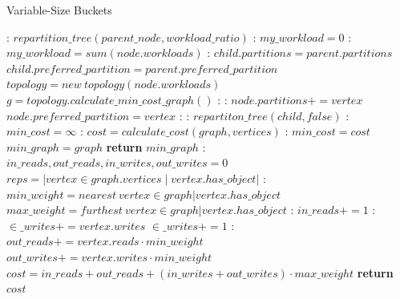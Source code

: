 \begin{algorithm}
  \caption{Variable-Size Buckets}\label{alg:variable-size}
  \begin{algorithmic}[1]
    :
  \State $repartition\_tree(parent\_node, workload\_ratio)$
  \EndFunction
  :
    \State $my\_workload = 0$
    :
      \State $my\_workload = sum(node.workloads)$
      :
      \State $child.partitions = parent.partitions$
      \State $child.preferred\_partition = parent.preferred\_partition$
      \Else
      \State $topology = new\ topology(node.workloads)$
      \State $g = topology.calculate\_min\_cost\_graph()$
      :
        :
        \State $node.partitions += vertex$
            \State $node.preferred\_partition = vertex$
          \EndIf
        \EndIf
      \EndFor
    \EndIf
    \EndIf
    :
      :
        \State $repartiton\_tree(child, false)$
        \EndFor
    \EndIf
    \EndFunction
    :
    \State $min\_cost = \infty$
      :
        \State $cost = calculate\_cost(graph, vertices)$
        :
          \State $min\_cost = cost$
          \State $min\_graph = graph$
        \EndIf
      \EndFor
    \State \textbf{return} $min\_graph$
    \EndFunction
    :
      \State $in\_reads, out\_reads, in\_writes, out\_writes = 0$
      \State $reps = |vertex \in graph.vertices \mid vertex.has\_object|$
      :
      \State $min\_weight = nearest\ vertex \in graph | vertex.has\_object$
      \State $max\_weight = furthest\ vertex \in graph | vertex.has\_object$
        :
          \State $in\_reads+= 1$
          :
          \State $\in\_writes+= vertex.writes$
          \Else
          \State  $\in\_writes+= 1 $
          \EndIf
        \Else:
          \State $out\_reads += vertex.reads \cdot min\_weight$
          \State $out\_writes += vertex.writes \cdot min\_weight$
        \EndIf
      \EndFor
      \State $cost = in\_reads+ out\_reads + (in\_writes+ out\_writes) \cdot max\_weight$
      \State \textbf{return} $cost$
  \EndFunction
  \end{algorithmic}
  \end{algorithm}

